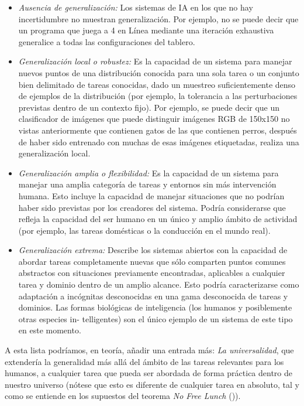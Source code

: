 \begin{itemize}
\item \textit{Ausencia de generalización:} Los sistemas de IA en los que no hay incertidumbre no muestran generalización. Por ejemplo, no se puede decir que un programa que juega a 4 en Línea mediante una iteración exhaustiva generalice a todas las configuraciones del tablero.

\item \textit{Generalización local o robustez:} Es la capacidad de un sistema para manejar nuevos puntos de una distribución conocida para una sola tarea o un conjunto bien delimitado de tareas conocidas, dado un muestreo suficientemente denso de ejemplos de la distribución (por ejemplo, la tolerancia a las perturbaciones previstas dentro de un contexto fijo). Por ejemplo, se puede decir que un clasificador de imágenes que puede distinguir imágenes RGB de 150x150 no vistas anteriormente que contienen gatos de las que contienen perros, después de haber sido entrenado con muchas de esas imágenes etiquetadas, realiza una generalización local. 

\item \textit{Generalización amplia o flexibilidad:} Es la capacidad de un sistema para manejar una amplia categoría de tareas y entornos sin más intervención humana. Esto incluye la capacidad de manejar situaciones que no podrían haber sido previstas por los creadores del sistema. Podría considerarse que refleja la capacidad del ser humano en un único y amplio ámbito de actividad (por ejemplo, las tareas domésticas o la conducción en el mundo real).

\item \textit{Generalización extrema:} Describe los sistemas abiertos con la capacidad de abordar tareas completamente nuevas que sólo comparten puntos comunes abstractos con situaciones previamente encontradas, aplicables a cualquier tarea y dominio dentro de un amplio alcance. Esto podría caracterizarse como adaptación a incógnitas desconocidas en una gama desconocida de tareas y dominios. Las formas biológicas de inteligencia (los humanos y posiblemente otras especies in- telligentes) son el único ejemplo de un sistema de este tipo en este momento.
\end{itemize}

A esta lista podríamos, en teoría, añadir una entrada más: \textit{La universalidad}, que extendería la generalidad más allá del ámbito de las tareas relevantes para los humanos, a cualquier tarea que pueda ser abordada de forma práctica dentro de nuestro universo (nótese que esto es diferente de cualquier tarea en absoluto, tal y como se entiende en los supuestos del teorema \textit{No Free Lunch} (\cite{wolpert1997no})).

